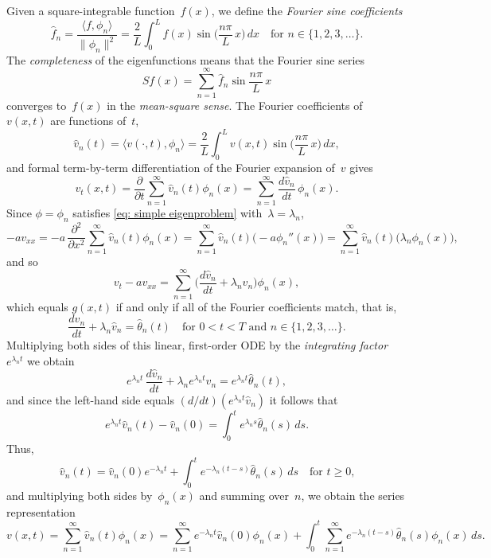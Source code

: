 Given a square-integrable function~$f(x)$, we define the 
\emph{Fourier sine coefficients}
\[
\hat f_n=\frac{\langle f,\phi_n\rangle}{\|\phi_n\|^2}
    =\frac{2}{L}\int_0^Lf(x)\sin\biggl(\frac{n\pi}{L}\,x\biggr)\,dx
    \quad\text{for $n\in\{1,2,3,\ldots\}$.}
\]
The \emph{completeness} of the eigenfunctions means that the Fourier sine series
\[
Sf(x)=\sum_{n=1}^\infty\hat f_n\sin\frac{n\pi}{L}\,x
\]
converges to~$f(x)$ in the \emph{mean-square sense}.  The Fourier coefficients 
of~$v(x,t)$ are functions of~$t$,
\[
\hat v_n(t)=\langle v(\cdot,t),\phi_n\rangle
    =\frac{2}{L}\int_0^Lv(x,t)\sin\biggl(\frac{n\pi}{L}\,x\biggr)\,dx,
\]
and formal term-by-term differentiation of the Fourier expansion of~$v$ gives
\[
v_t(x,t)=\frac{\partial}{\partial t}\sum_{n=1}^\infty\hat v_n(t)\phi_n(x)
    =\sum_{n=1}^\infty\frac{d\hat v_n}{dt}\,\phi_n(x).
\]
Since $\phi=\phi_n$ satisfies \eqref{eq: simple eigenproblem} 
with~$\lambda=\lambda_n$,
\[
-av_{xx}=-a\,\frac{\partial^2}{\partial x^2}
    \sum_{n=1}^\infty\hat v_n(t)\phi_n(x)
    =\sum_{n=1}^\infty\hat v_n(t)\bigl(-a\phi_n''(x)\bigr)
    =\sum_{n=1}^\infty\hat v_n(t)\bigl(\lambda_n\phi_n(x)\bigr),
\]
and so
\[
v_t-av_{xx}=\sum_{n=1}^\infty
	\biggl(\frac{d\hat v_n}{dt}+\lambda_n\hat v_n\biggr)\phi_n(x),
\]
which equals $g(x,t)$ if and only if all of the Fourier coefficients match, 
that is,
\[
\frac{d\hat v_n}{dt}+\lambda_n\hat v_n=\hat \theta_n(t)
    \quad\text{for $0<t<T$ and $n\in\{1,2,3,\ldots\}$.}
\]
Multiplying both sides of this linear, first-order ODE by the 
\emph{integrating factor}~$e^{\lambda_n t}$ we obtain
\[
e^{\lambda_nt}\,\frac{d\hat v_n}{dt}+\lambda_ne^{\lambda_nt}\hat v_n
	=e^{\lambda_nt}\hat\theta_n(t),
\]
and since the left-hand side equals $(d/dt)(e^{\lambda_nt}\hat v_n)$ it 
follows that
\[
e^{\lambda_nt}\hat v_n(t)-\hat v_n(0)=\int_0^te^{\lambda_ns}\hat\theta_n(s)\,ds.
\]
Thus,
\begin{equation}\label{eq: Duhamel n}
\hat v_n(t)=\hat v_n(0)e^{-\lambda_nt}
	+\int_0^te^{-\lambda_n(t-s)}\hat\theta_n(s)\,ds\quad\text{for $t\ge0$,}
\end{equation}
and multiplying both sides by~$\phi_n(x)$ and summing over~$n$, we obtain the
series representation
\[
v(x,t)=\sum_{n=1}^\infty\hat v_n(t)\phi_n(x)
	=\sum_{n=1}^\infty e^{-\lambda_nt}\hat v_n(0)\phi_n(x)
	+\int_0^t\sum_{n=1}^\infty e^{-\lambda_n(t-s)}\hat\theta_n(s)\phi_n(x)\,ds.
\]

